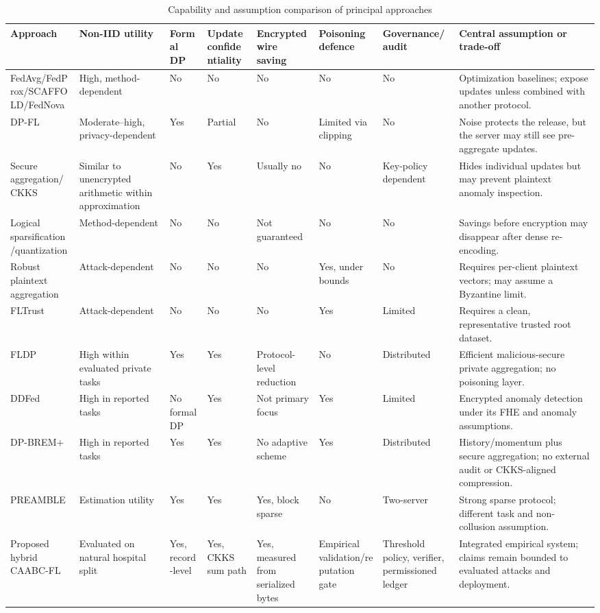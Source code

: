 \begin{table}[htbp]
\centering
\caption{Capability and assumption comparison of principal approaches}
\label{tab:approach-comparison}
\scriptsize
\begin{tabularx}{\textwidth}{@{}p{2.2cm}p{1.45cm}p{1.5cm}p{1.45cm}p{1.45cm}p{1.45cm}p{1.6cm}X@{}}
\toprule
Approach & Non-IID utility & Formal DP & Update confidentiality & Encrypted wire saving & Poisoning defence & Governance/audit & Central assumption or trade-off \\
\midrule
FedAvg/FedProx/SCAFFOLD/FedNova & High, method-dependent & No & No & No & No & No & Optimization baselines; expose updates unless combined with another protocol. \\
DP-FL & Moderate--high, privacy-dependent & Yes & Partial & No & Limited via clipping & No & Noise protects the release, but the server may still see pre-aggregate updates. \\
Secure aggregation/CKKS & Similar to unencrypted arithmetic within approximation & No & Yes & Usually no & No & Key-policy dependent & Hides individual updates but may prevent plaintext anomaly inspection. \\
Logical sparsification/quantization & Method-dependent & No & No & Not guaranteed & No & No & Savings before encryption may disappear after dense re-encoding. \\
Robust plaintext aggregation & Attack-dependent & No & No & No & Yes, under bounds & No & Requires per-client plaintext vectors; may assume a Byzantine limit. \\
FLTrust & Attack-dependent & No & No & No & Yes & Limited & Requires a clean, representative trusted root dataset. \\
FLDP & High within evaluated private tasks & Yes & Yes & Protocol-level reduction & No & Distributed & Efficient malicious-secure private aggregation; no poisoning layer. \\
DDFed & High in reported tasks & No formal DP & Yes & Not primary focus & Yes & Limited & Encrypted anomaly detection under its FHE and anomaly assumptions. \\
DP-BREM+ & High in reported tasks & Yes & Yes & No adaptive scheme & Yes & Distributed & History/momentum plus secure aggregation; no external audit or CKKS-aligned compression. \\
PREAMBLE & Estimation utility & Yes & Yes & Yes, block sparse & No & Two-server & Strong sparse protocol; different task and non-collusion assumption. \\
Proposed hybrid CAABC-FL & Evaluated on natural hospital split & Yes, record-level & Yes, CKKS sum path & Yes, measured from serialized bytes & Empirical validation/reputation gate & Threshold policy, verifier, permissioned ledger & Integrated empirical system; claims remain bounded to evaluated attacks and deployment. \\
\bottomrule
\end{tabularx}
\end{table}

